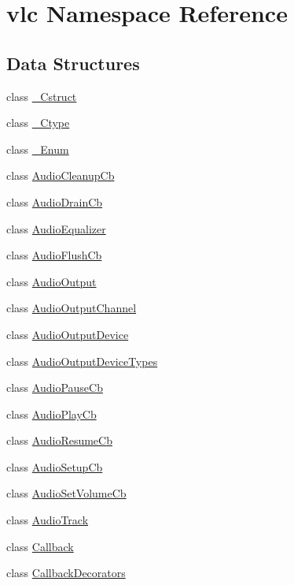 \hypertarget{namespacevlc}{}\section{vlc Namespace Reference}
\label{namespacevlc}
\subsection*{Data Structures}
\begin{DoxyCompactItemize}
\item 
class \hyperlink{classvlc_1_1___cstruct}{\+\_\+\+Cstruct}
\item 
class \hyperlink{classvlc_1_1___ctype}{\+\_\+\+Ctype}
\item 
class \hyperlink{classvlc_1_1___enum}{\+\_\+\+Enum}
\item 
class \hyperlink{classvlc_1_1_audio_cleanup_cb}{Audio\+Cleanup\+Cb}
\item 
class \hyperlink{classvlc_1_1_audio_drain_cb}{Audio\+Drain\+Cb}
\item 
class \hyperlink{classvlc_1_1_audio_equalizer}{Audio\+Equalizer}
\item 
class \hyperlink{classvlc_1_1_audio_flush_cb}{Audio\+Flush\+Cb}
\item 
class \hyperlink{classvlc_1_1_audio_output}{Audio\+Output}
\item 
class \hyperlink{classvlc_1_1_audio_output_channel}{Audio\+Output\+Channel}
\item 
class \hyperlink{classvlc_1_1_audio_output_device}{Audio\+Output\+Device}
\item 
class \hyperlink{classvlc_1_1_audio_output_device_types}{Audio\+Output\+Device\+Types}
\item 
class \hyperlink{classvlc_1_1_audio_pause_cb}{Audio\+Pause\+Cb}
\item 
class \hyperlink{classvlc_1_1_audio_play_cb}{Audio\+Play\+Cb}
\item 
class \hyperlink{classvlc_1_1_audio_resume_cb}{Audio\+Resume\+Cb}
\item 
class \hyperlink{classvlc_1_1_audio_setup_cb}{Audio\+Setup\+Cb}
\item 
class \hyperlink{classvlc_1_1_audio_set_volume_cb}{Audio\+Set\+Volume\+Cb}
\item 
class \hyperlink{classvlc_1_1_audio_track}{Audio\+Track}
\item 
class \hyperlink{classvlc_1_1_callback}{Callback}
\item 
class \hyperlink{classvlc_1_1_callback_decorators}{Callback\+Decorators}

\end{DoxyCompactItemize}
